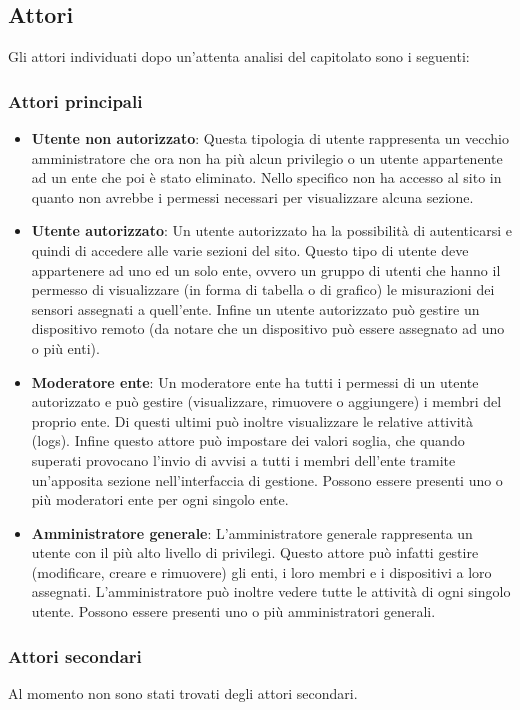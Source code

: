 	\subsection{Attori}
		Gli attori individuati dopo un'attenta analisi del capitolato sono i seguenti:
		\subsubsection{Attori principali}
		\begin{itemize}
			\item \textbf{Utente non autorizzato}: Questa tipologia di utente rappresenta un 
			vecchio amministratore che ora non ha più alcun privilegio o un utente appartenente ad un ente che poi è stato eliminato. Nello specifico non ha accesso al sito in quanto non avrebbe i permessi necessari per visualizzare alcuna sezione.

			\item \textbf{Utente autorizzato}: Un utente autorizzato ha la possibilità di autenticarsi e quindi di accedere alle varie sezioni del sito. Questo tipo di utente deve appartenere ad uno ed un solo ente, ovvero un gruppo di utenti che hanno il permesso di visualizzare (in forma di tabella o di grafico) le misurazioni dei sensori assegnati a quell'ente.
			Infine un utente autorizzato può gestire un dispositivo remoto (da notare che un dispositivo può essere assegnato ad uno o più enti).

			\item \textbf{Moderatore ente}: Un moderatore ente ha tutti i permessi di un utente autorizzato e può gestire (visualizzare, rimuovere o aggiungere) i membri del proprio ente. Di questi ultimi può inoltre visualizzare le relative attività (logs).
			Infine questo attore può impostare dei valori soglia, che quando superati provocano l'invio di avvisi a tutti i membri dell'ente tramite un'apposita sezione nell'interfaccia di gestione. 
			Possono essere presenti uno o più moderatori ente per ogni singolo ente.

			\item \textbf{Amministratore generale}: L'amministratore generale rappresenta un utente con il più alto livello di privilegi. Questo attore può infatti gestire (modificare, creare e rimuovere) gli enti, i loro membri e i dispositivi a loro assegnati.
			L'amministratore può inoltre vedere tutte le attività di ogni singolo utente.
			Possono essere presenti uno o più amministratori generali.
		\end{itemize}
		\subsubsection{Attori secondari}
			Al momento non sono stati trovati degli attori secondari.

	